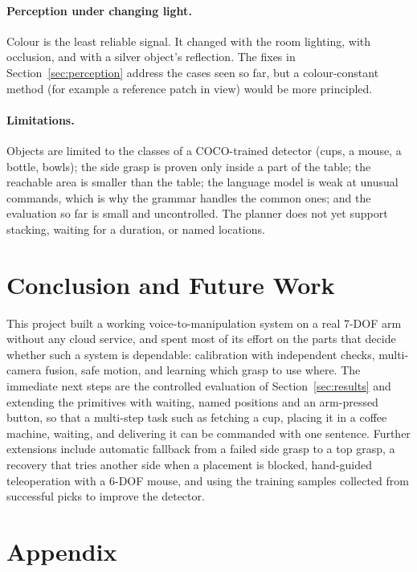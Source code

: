 \documentclass[12pt]{article}
\begin{document}
\paragraph{Perception under changing light.}
Colour is the least reliable signal. It changed with the room lighting, with occlusion, and with a silver object's reflection. The fixes in Section~\ref{sec:perception} address the cases seen so far, but a colour-constant method (for example a reference patch in view) would be more principled.

\paragraph{Limitations.}
Objects are limited to the classes of a COCO-trained detector (cups, a mouse, a bottle, bowls); the side grasp is proven only inside a part of the table; the reachable area is smaller than the table; the language model is weak at unusual commands, which is why the grammar handles the common ones; and the evaluation so far is small and uncontrolled. The planner does not yet support stacking, waiting for a duration, or named locations.

\section{Conclusion and Future Work}

This project built a working voice-to-manipulation system on a real 7-DOF arm without any cloud service, and spent most of its effort on the parts that decide whether such a system is dependable: calibration with independent checks, multi-camera fusion, safe motion, and learning which grasp to use where. The immediate next steps are the controlled evaluation of Section~\ref{sec:results} and extending the primitives with waiting, named positions and an arm-pressed button, so that a multi-step task such as fetching a cup, placing it in a coffee machine, waiting, and delivering it can be commanded with one sentence. Further extensions include automatic fallback from a failed side grasp to a top grasp, a recovery that tries another side when a placement is blocked, hand-guided teleoperation with a 6-DOF mouse, and using the training samples collected from successful picks to improve the detector.



\newpage

\section*{Appendix}
\end{document}
